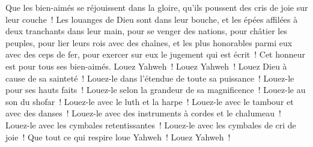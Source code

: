\begin{multicols}{2}
Que les bien-aimés se réjouissent dans la gloire, qu'ils poussent des cris de joie sur leur couche~!
Les louanges de Dieu sont dans leur bouche, et les épées affilées à deux tranchants dans leur main,
pour se venger des nations, pour châtier les peuples,
pour lier leurs rois avec des chaînes, et les plus honorables parmi eux avec des ceps de fer,
pour exercer sur eux le jugement qui est écrit~! Cet honneur est pour tous ses bien-aimés. Louez Yahweh~!
\VerseOne{}Louez Yahweh~! Louez Dieu à cause de sa sainteté~! Louez-le dans l'étendue de toute sa puissance~!
Louez-le pour ses hauts faits~! Louez-le selon la grandeur de sa magnificence~!
Louez-le au son du shofar~! Louez-le avec le luth et la harpe~!
Louez-le avec le tambour et avec des danses~! Louez-le avec des instruments à cordes et le chalumeau~!
Louez-le avec les cymbales retentissantes~! Louez-le avec les cymbales de cri de joie~!
Que tout ce qui respire loue Yahweh~! Louez Yahweh~!
\PPE{}
\end{multicols}
